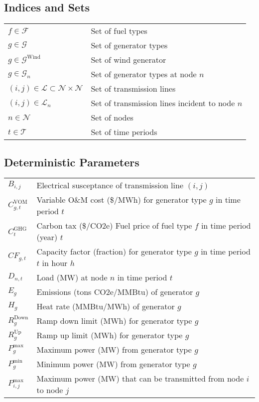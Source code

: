 \documentclass[10pt]{article}
\newcommand{\mc}{\mathcal}
\begin{document}
\subsection{Indices and Sets}

\begin{tabular}{ll}
$f \in \mc{F}$ & Set of fuel types \\
$g \in \mc{G}$ & Set of generator types \\
$g \in \mc{G}^{\text{Wind}}$ & Set of wind generator \\
$g \in \mc{G}_n$ & Set of generator types at node $n$ \\
$(i,j) \in \mc{L} \subset \mc{N} \times \mc{N}$ & Set of transmission lines \\
$(i,j) \in \mc{L}_n$ & Set of transmission lines incident to node $n$ \\
$n \in \mc{N}$ & Set of nodes \\
$t \in \mc{T}$ & Set of time periods \\
\end{tabular}

\subsection{Deterministic Parameters}

\begin{tabular}{ll}
$B_{i,j}$ & Electrical susceptance of transmission line $(i,j)$ \\
$C_{g,t}^{\text{VOM}}$ & Variable O\&M cost (\$/MWh) for generator type $g$ in time period $t$ \\
$C_{t}^{\text{GHG}}$ & Carbon tax (\$/CO2e) Fuel price of fuel type $f$ in time period (year) $t$ \\
$CF_{g,t}$ & Capacity factor (fraction) for generator type $g$ in time period $t$ in hour $h$ \\
$D_{n,t}$ & Load (MW) at node $n$ in time period $t$ \\
$E_g$ & Emissions (tons CO2e/MMBtu) of generator $g$ \\
$H_g$ & Heat rate (MMBtu/MWh) of generator $g$ \\
$R_g^{\text{Down}}$ & Ramp down limit (MWh) for generator type $g$ \\
$R_g^{\text{Up}}$ & Ramp up limit (MWh) for generator type $g$ \\
$P_{g}^{\max}$ & Maximum power (MW) from generator type $g$ \\
$P_{g}^{\min}$ & Minimum power (MW) from generator type $g$ \\
$P_{i,j}^{\max}$ & Maximum power (MW) that can be transmitted from node $i$ to node $j$ \\
\end{tabular}
\end{document}
